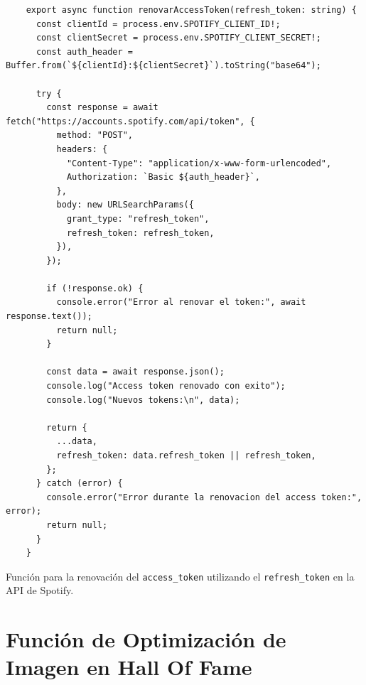 \begin{ifalgorithm}[H]
  \begin{lstlisting}
    export async function renovarAccessToken(refresh_token: string) {
      const clientId = process.env.SPOTIFY_CLIENT_ID!;
      const clientSecret = process.env.SPOTIFY_CLIENT_SECRET!;
      const auth_header = Buffer.from(`${clientId}:${clientSecret}`).toString("base64");

      try {
        const response = await fetch("https://accounts.spotify.com/api/token", {
          method: "POST",
          headers: {
            "Content-Type": "application/x-www-form-urlencoded",
            Authorization: `Basic ${auth_header}`,
          },
          body: new URLSearchParams({
            grant_type: "refresh_token",
            refresh_token: refresh_token,
          }),
        });

        if (!response.ok) {
          console.error("Error al renovar el token:", await response.text());
          return null;
        }

        const data = await response.json();
        console.log("Access token renovado con exito");
        console.log("Nuevos tokens:\n", data);

        return {
          ...data,
          refresh_token: data.refresh_token || refresh_token,
        };
      } catch (error) {
        console.error("Error durante la renovacion del access token:", error);
        return null;
      }
    }
    \end{lstlisting}
  \caption{Función para la renovación del \texttt{access\_token} utilizando el \texttt{refresh\_token} en la API de Spotify.}
  \label{alg:renovar_access_token}
\end{ifalgorithm}

\section*{Función de Optimización de Imagen en Hall Of Fame}

